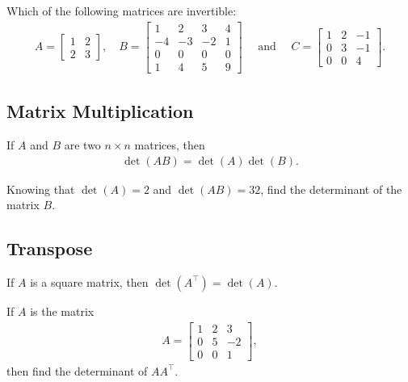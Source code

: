 \documentclass[12pt,a4paper]{article}
\newcounter{example}[section]
\begin{document}
	\begin{example}
	Which of the following matrices are invertible:
		\begin{align*}
		A = \begin{bmatrix}
		1 & 2 \\
		2 & 3 
		\end{bmatrix}, 
		\quad
		B = \begin{bmatrix}
		1 & 2 & 3 & 4 \\
		-4 & -3 & -2 & 1 \\
		0 & 0 & 0 & 0 \\
		1 & 4 & 5 & 9
		\end{bmatrix}
		\quad \text{ and } \quad
		C = \begin{bmatrix}
		1 & 2 & -1 \\
		0 & 3 & -1 \\
		0 & 0 & 4
		\end{bmatrix} .
		\end{align*}
	\end{example}
	
	\newpage
	
	\subsection{Matrix Multiplication}
	
	If $A$ and $B$ are two $n \times n$ matrices, then
		\begin{align*}
		\det (AB ) = \det (A) \det (B) .
		\end{align*}
	
	\begin{example}
	Knowing that $\det (A) = 2$ and $\det (AB ) = 32$, find the determinant of the matrix $B$.
	\end{example}
	
	\vspace*{10cm}
	
	\subsection{Transpose}
	If $A$ is a square matrix, then $\det (A^\top ) = \det (A)$.
	
	\vspace*{16pt}
	
	\begin{example}
	If $A$ is the matrix
		\begin{align*}
		A = \begin{bmatrix}
		1 & 2 & 3 \\
		0 & 5 & -2 \\
		0 & 0 & 1
		\end{bmatrix}, 
		\end{align*}
	then find the determinant of $AA^{\top}$.
	\end{example}
	
\end{document}
